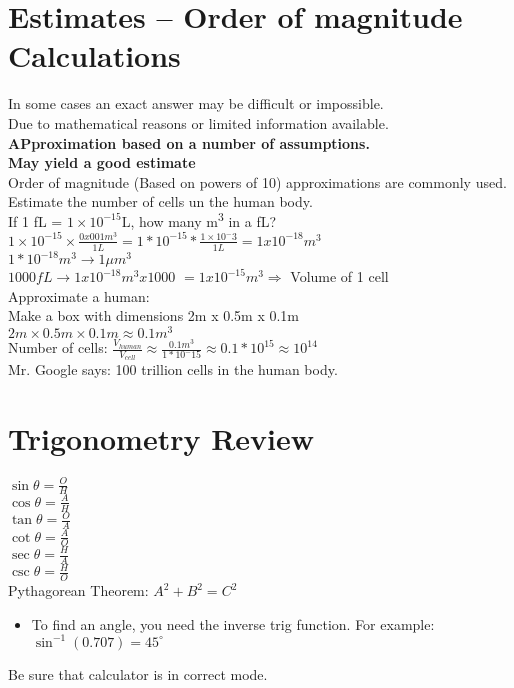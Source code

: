 \documentclass[]{article}
\begin{document}
\section*{Estimates -- Order of magnitude Calculations}
In some cases an exact answer may be difficult or impossible.\\
Due to mathematical reasons or limited information available.\\
\textbf{APproximation based on a number of assumptions.\\May yield a good estimate}\\
Order of magnitude (Based on powers of 10) approximations are commonly used.
Estimate the number of cells un the human body.\\
If 1 fL = $1 \times 10^{-15}$L, how many m\textsuperscript{$3$} in a fL?\\
$1\times 10^{-15} \times \frac{0x001m^3}{1L} = 1*10^{-15} * \frac {1 \times 10^-3}{1L} = 1x10^{-18}m^3$\\
$1*10^{-18}m^{3} \rightarrow 1\mu m^3$\\
$1000 fL \rightarrow 1x10^{-18}m^3 x 1000$
$= 1x10^{-15}m^3 \Rightarrow$ Volume of 1 cell\\
Approximate a human:\\
Make a box with dimensions 2m x 0.5m x 0.1m\\
$2m \times 0.5m \times 0.1m \approx 0.1m^3$\\
Number of cells:
$\frac{V_{human}}{V_{cell}} \approx \frac{0.1m^3}{1*10^-15} \approx 0.1 * 10^15 \approx 10^{14}$\\
Mr. Google says: 100 trillion cells in the human body.\\

\section*{Trigonometry Review}
$\sin\theta = \frac{O}{H}$\\
$\cos\theta = \frac{A}{H}$\\
$\tan\theta = \frac{O}{A}$\\
$\cot\theta = \frac{A}{O}$\\
$\sec\theta = \frac{H}{A}$\\
$\csc\theta = \frac{H}{O}$\\
Pythagorean Theorem: $A^2 + B^2 = C^2$\\
\begin{itemize}
    \item To find an angle, you need the inverse trig function.
        For example: $\sin^{-1}(0.707) = 45^{\circ}$
\end{itemize}
Be sure that calculator is in correct mode.
\end{document}
